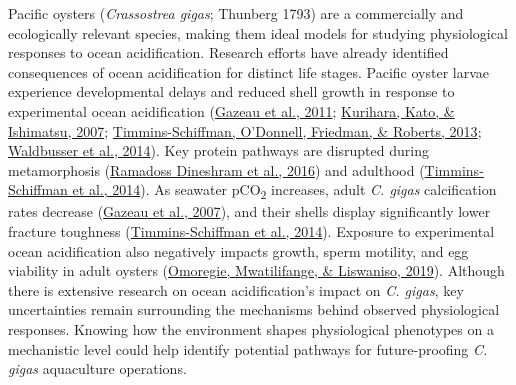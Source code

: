 \documentclass [11pt, proquest] {uwthesis}[2015/03/03]
\begin{document}
Pacific oysters (\emph{Crassostrea gigas}; Thunberg 1793) are a commercially and ecologically relevant species, making them ideal models for studying physiological responses to ocean acidification. Research efforts have already identified consequences of ocean acidification for distinct life stages. Pacific oyster larvae experience developmental delays and reduced shell growth in response to experimental ocean acidification (\protect\hyperlink{ref-Gazeau2011}{Gazeau et al., 2011}; \protect\hyperlink{ref-Kurihara2007}{Kurihara, Kato, \& Ishimatsu, 2007}; \protect\hyperlink{ref-Timmins-Schiffman2013}{Timmins-Schiffman, O'Donnell, Friedman, \& Roberts, 2013}; \protect\hyperlink{ref-Waldbusser2014}{Waldbusser et al., 2014}). Key protein pathways are disrupted during metamorphosis (\protect\hyperlink{ref-Dineshram2016}{Ramadoss Dineshram et al., 2016}) and adulthood (\protect\hyperlink{ref-Timmins-Schiffman2014}{Timmins-Schiffman et al., 2014}). As seawater pCO\textsubscript{2} increases, adult \emph{C. gigas} calcification rates decrease (\protect\hyperlink{ref-Gazeau2007}{Gazeau et al., 2007}), and their shells display significantly lower fracture toughness (\protect\hyperlink{ref-Timmins-Schiffman2014}{Timmins-Schiffman et al., 2014}). Exposure to experimental ocean acidification also negatively impacts growth, sperm motility, and egg viability in adult oysters (\protect\hyperlink{ref-Omoregie2019}{Omoregie, Mwatilifange, \& Liswaniso, 2019}). Although there is extensive research on ocean acidification's impact on \emph{C. gigas}, key uncertainties remain surrounding the mechanisms behind observed physiological responses. Knowing how the environment shapes physiological phenotypes on a mechanistic level could help identify potential pathways for future-proofing \emph{C. gigas} aquaculture operations.
\end{document}
